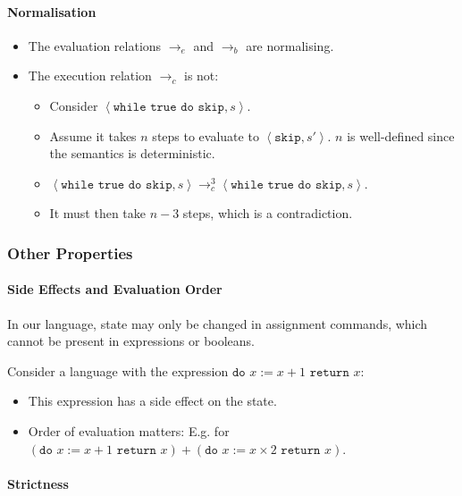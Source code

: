 \documentclass[twocolumn,english]{article}
\begin{document}
\paragraph{Normalisation}
\begin{itemize}
\item The evaluation relations $\rightarrow_{e}$ and $\rightarrow_{b}$
are normalising.
\item The execution relation $\rightarrow_{c}$ is not:
\begin{itemize}
\item Consider $\left\langle \texttt{while true do skip},s\right\rangle $.
\item Assume it takes $n$ steps to evaluate to $\left\langle \texttt{skip},s'\right\rangle $.
$n$ is well-defined since the semantics is deterministic.
\item $\left\langle \texttt{while true do skip},s\right\rangle \rightarrow_{c}^{3}\left\langle \texttt{while true do skip},s\right\rangle $.
\item It must then take $n-3$ steps, which is a contradiction.
\end{itemize}
\end{itemize}

\subsubsection{Other Properties}

\paragraph{Side Effects and Evaluation Order}

In our language, state may only be changed in assignment commands,
which cannot be present in expressions or booleans.

Consider a language with the expression \texttt{$\texttt{do }x:=x+1\texttt{ return }x$}:
\begin{itemize}
\item This expression has a side effect on the state.
\item Order of evaluation matters: E.g. for $(\texttt{do }x:=x+1\texttt{ return }x)+(\texttt{do }x:=x\times2\texttt{ return }x)$.
\end{itemize}

\paragraph{Strictness}
\end{document}
